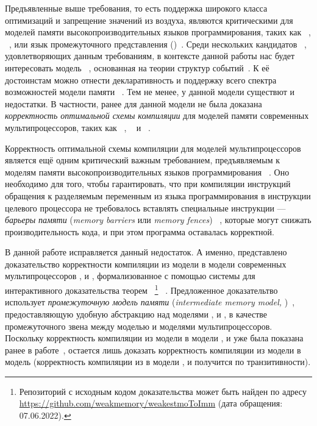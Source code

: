 Предъявленные выше требования, 
то есть поддержка широкого класса оптимизаций и 
запрещение значений из воздуха, являются 
критическими для моделей памяти высокопроизводительных 
языков программирования, таких как \CPP~\cite{Batty-al:POPL11}, 
\Java~\cite{Manson-al:POPL05}, или язык промежуточного представления \LLVM 
(\LLVMIR)~\cite{Chakraborty-Vafeiadis:CGO17}.
Среди нескольких кандидатов~%
\cite{Kang-al:POPL17,Paviotti-al:ESOP20,Jagadeesan-al:OOPSLA2020}, 
удовлетворяющих данным требованиям, в контексте данной работы нас будет 
интересовать модель \Wkm~\cite{Chakraborty-Vafeiadis:POPL19}, 
основанная на теории структур событий~\cite{Winskel:86}. 
К её достоинстам можно отнести декларативность и поддержку 
всего спектра возможностей модели памяти \CPP~\cite{Batty-al:POPL11}. 
Тем не менее, у данной модели существют и недостатки. 
В частности, ранее для данной модели не была доказана 
\emph{корректность оптимальной схемы компиляции} для моделей памяти 
современных мультипроцессоров, таких как 
\Intel~\cite{Sewell-al:CACM10}, \ARM~\cite{Pulte-al:POPL18} 
и \POWER~\cite{Alglave-al:TOPLAS14}. 
 
Корректность оптимальной схемы компиляции для моделей мультипроцессоров 
является ещё одним критический важным требованием, 
предъявляемым к моделям памяти высокопроизводительных языков программирования%
~\cite{Moiseenko-al:PCS21}.
Оно необходимо для того, чтобы гарантировать, 
что при компиляции инструкций обращения к разделяемым переменным 
из языка программирования в инструкции целевого процессора
не требовалось вставлять специальные инструкции --- 
\emph{барьеры памяти} (\emph{memory barriers} или \emph{memory fences})%
~\cite{McKenney:2010}, которые могут снижать производительность кода,
и при этом программа оставалась корректной. 

В данной работе исправляется данный недостаток. 
А именно, представлено доказательство корректности компиляции
из модели \Wkm в модели современных мультипроцессоров \Intel, \ARM и \POWER, 
формализованное с помощью системы для интерактивного 
доказательства теорем~\coq%
\footnote{Репозиторий с исходным кодом доказательства может быть найден 
по адресу \url{https://github.com/weakmemory/weakestmoToImm} (дата обращения: 07.06.2022).}%
~\cite{Coq}.
Предложенное доказательтво использует \emph{промежуточную модель памяти}
(\emph{intermediate memory model, \IMM})~\cite{Podkopaev-al:POPL19}, 
предоставляющую удобную абстракцию над моделями \Intel, \ARM и \POWER, 
в качестве промежуточного звена между моделью \Wkm и моделями мультипроцессоров.
Поскольку корректность компиляции из модели \IMM в модели \Intel, \ARM и \POWER
уже была показана ранее в работе~\cite{Podkopaev-al:POPL19},
остается лишь доказать корректность компиляции из модели \Wkm
в модель \IMM (корректность компиляции из \Wkm в модели \Intel, \ARM и \POWER
получится по транзитивности). 

